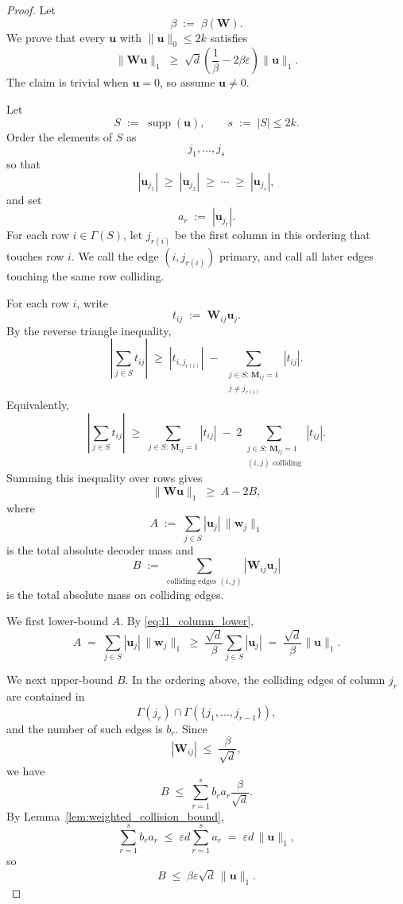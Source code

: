 \documentclass{article}
\theoremstyle{plain}
\theoremstyle{definition}
\theoremstyle{remark}
\begin{document}
\begin{proof}
Let
\[
    \beta \;:=\; \beta(\mathbf{W}).
\]
We prove that every $\mathbf{u}$ with $\|\mathbf{u}\|_0 \le 2k$ satisfies
\[
    \|\mathbf{W}\mathbf{u}\|_1
    \;\ge\;
    \sqrt{d}
    \left(
        \frac{1}{\beta} - 2\beta\varepsilon
    \right)
    \|\mathbf{u}\|_1.
\]
The claim is trivial when $\mathbf{u} = 0$, so assume $\mathbf{u} \neq 0$.

Let
\[
    S \;:=\; \operatorname{supp}(\mathbf{u}),
    \qquad
    s \;:=\; |S| \le 2k.
\]
Order the elements of $S$ as
\[
    j_1, \dots, j_s
\]
so that
\[
    |\mathbf{u}_{j_1}|
    \;\ge\;
    |\mathbf{u}_{j_2}|
    \;\ge\;
    \cdots
    \;\ge\;
    |\mathbf{u}_{j_s}|,
\]
and set
\[
    a_r \;:=\; |\mathbf{u}_{j_r}|.
\]
For each row $i \in \Gamma(S)$, let $j_{r(i)}$ be the first column in this ordering that touches row $i$. We call the edge $(i, j_{r(i)})$ primary, and call all later edges touching the same row colliding.

For each row $i$, write
\[
    t_{ij} \;:=\; \mathbf{W}_{ij}\mathbf{u}_j.
\]
By the reverse triangle inequality,
\[
    \left|
        \sum_{j \in S} t_{ij}
    \right|
    \;\ge\;
    |t_{i, j_{r(i)}}|
    \;-\;
    \sum_{\substack{j \in S:\,\mathbf{M}_{ij} = 1 \\ j \neq j_{r(i)}}}
    |t_{ij}|.
\]
Equivalently,
\[
    \left|
        \sum_{j \in S} t_{ij}
    \right|
    \;\ge\;
    \sum_{j \in S:\,\mathbf{M}_{ij} = 1} |t_{ij}|
    \;-\;
    2 \sum_{\substack{j \in S:\,\mathbf{M}_{ij} = 1 \\ (i,j) \text{ colliding}}}
    |t_{ij}|.
\]
Summing this inequality over rows gives
\begin{equation}
\label{eq:collision_decomposition}
    \|\mathbf{W}\mathbf{u}\|_1
    \;\ge\;
    A - 2B,
\end{equation}
where
\[
    A
    \;:=\;
    \sum_{j \in S}
    |\mathbf{u}_j|\,\|\mathbf{w}_j\|_1
\]
is the total absolute decoder mass and
\[
    B
    \;:=\;
    \sum_{\text{colliding edges } (i, j)}
    |\mathbf{W}_{ij}\mathbf{u}_j|
\]
is the total absolute mass on colliding edges.

We first lower-bound $A$. By \eqref{eq:l1_column_lower},
\[
    A
    \;=\;
    \sum_{j \in S} |\mathbf{u}_j|\,\|\mathbf{w}_j\|_1
    \;\ge\;
    \frac{\sqrt{d}}{\beta}
    \sum_{j \in S} |\mathbf{u}_j|
    \;=\;
    \frac{\sqrt{d}}{\beta}
    \|\mathbf{u}\|_1.
\]

We next upper-bound $B$. In the ordering above, the colliding edges of column $j_r$ are contained in
\[
    \Gamma(j_r) \cap \Gamma(\{j_1, \dots, j_{r-1}\}),
\]
and the number of such edges is $b_r$. Since
\[
    |\mathbf{W}_{ij}|
    \;\le\;
    \frac{\beta}{\sqrt{d}},
\]
we have
\[
    B
    \;\le\;
    \sum_{r=1}^s
    b_r a_r
    \frac{\beta}{\sqrt{d}}.
\]
By Lemma~\ref{lem:weighted_collision_bound},
\[
    \sum_{r=1}^s b_r a_r
    \;\le\;
    \varepsilon d
    \sum_{r=1}^s a_r
    \;=\;
    \varepsilon d\,\|\mathbf{u}\|_1,
\]
so
\[
    B
    \;\le\;
    \beta\varepsilon\sqrt{d}\,\|\mathbf{u}\|_1.
\]


\end{proof}
\end{document}
